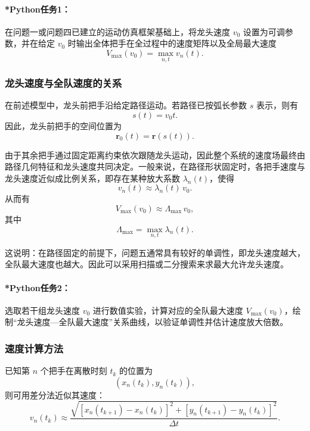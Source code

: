 \documentclass[12pt,a4paper]{ctexart}
\begin{document}
\paragraph{*Python任务1：}
在问题一或问题四已建立的运动仿真框架基础上，将龙头速度 $v_0$ 设置为可调参数，并在给定 $v_0$ 时输出全体把手在全过程中的速度矩阵以及全局最大速度
\[
V_{\max}(v_0)=\max_{n,t} v_n(t).
\]

\subsubsection{龙头速度与全队速度的关系}
在前述模型中，龙头前把手沿给定路径运动。若路径已按弧长参数 $s$ 表示，则有
\begin{equation}
s(t)=v_0 t.
\end{equation}
因此，龙头前把手的空间位置为
\begin{equation}
\bm{r}_0(t)=\bm{r}(s(t)).
\end{equation}

由于其余把手通过固定距离约束依次跟随龙头运动，因此整个系统的速度场最终由路径几何特征和龙头速度共同决定。一般来说，在路径形状固定时，各把手速度与龙头速度近似成比例关系，即存在某种放大系数 $\lambda_n(t)$，使得
\begin{equation}
v_n(t)\approx \lambda_n(t)\,v_0.
\end{equation}
从而有
\begin{equation}
V_{\max}(v_0)\approx \Lambda_{\max}\,v_0,
\end{equation}
其中
\begin{equation}
\Lambda_{\max}=\max_{n,t}\lambda_n(t).
\end{equation}

这说明：在路径固定的前提下，问题五通常具有较好的单调性，即龙头速度越大，全队最大速度也越大。因此可以采用扫描或二分搜索来求最大允许龙头速度。

\paragraph{*Python任务2：}
选取若干组龙头速度 $v_0$ 进行数值实验，计算对应的全队最大速度 $V_{\max}(v_0)$，绘制“龙头速度—全队最大速度”关系曲线，以验证单调性并估计速度放大倍数。

\subsubsection{速度计算方法}
已知第 $n$ 个把手在离散时刻 $t_k$ 的位置为
\[
(x_n(t_k),y_n(t_k)),
\]
则可用差分法近似其速度：
\begin{equation}
v_n(t_k)\approx
\frac{\sqrt{[x_n(t_{k+1})-x_n(t_k)]^2+[y_n(t_{k+1})-y_n(t_k)]^2}}{\Delta t}.
\end{equation}
\end{document}
